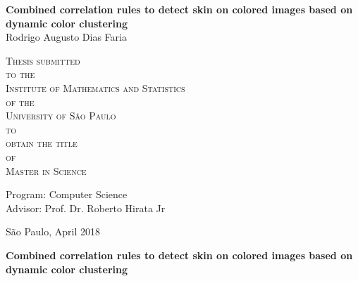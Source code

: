 \documentclass[11pt,twoside,a4paper]{book}
\theoremstyle{plain}
\theoremstyle{definition}
\begin{document}
\frontmatter 
\fancyhead[RO]{{\footnotesize\rightmark}\hspace{2em}\thepage}
\setcounter{tocdepth}{2}
\fancyhead[LE]{\thepage\hspace{2em}\footnotesize{\leftmark}}
\fancyhead[RE,LO]{}
\fancyhead[RO]{{\footnotesize\rightmark}\hspace{2em}\thepage}

\onehalfspacing  %

\thispagestyle{empty}
\begin{center}
    \vspace*{2.3cm}
    \textbf{\Large{Combined correlation rules to detect skin on colored images based on dynamic color clustering}}\\
    
    \vspace*{1.2cm}
    \Large{Rodrigo Augusto Dias Faria}
    
    \vskip 2cm
    \textsc{
    Thesis submitted\\[-0.25cm] 
    to the\\[-0.25cm]
    Institute of Mathematics and Statistics\\[-0.25cm]
    of the\\[-0.25cm]
    University of São Paulo\\[-0.25cm]
    to\\[-0.25cm]
    obtain the title\\[-0.25cm]
    of\\[-0.25cm]
    Master in Science}
    
    \vskip 1.5cm
    Program: Computer Science\\
    Advisor: Prof. Dr. Roberto Hirata Jr

    
    \vskip 1.5cm %
    \normalsize{São Paulo, April 2018}
\end{center}

%
%
%
\newpage
\thispagestyle{empty}
    \begin{center}
        \vspace*{2.3 cm}
        \textbf{\Large{Combined correlation rules to detect skin on colored images based on dynamic color clustering}}\\
        \vspace*{2 cm}
    \end{center}
\end{document}
